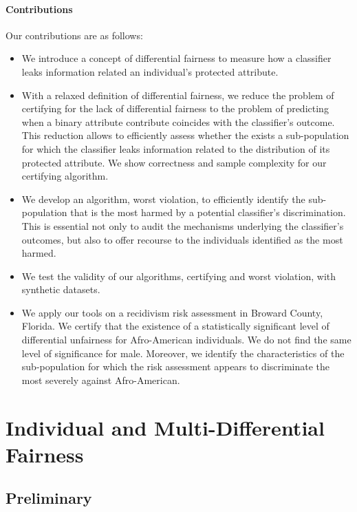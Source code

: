 \documentclass{article}
\begin{document}
 \paragraph{Contributions}
Our contributions are as follows:
\begin{itemize}
	\item We introduce a concept of differential fairness to measure how a classifier leaks information related an individual's protected attribute. 
	\item With a relaxed definition of differential fairness, we reduce the problem of certifying for the lack of differential fairness to the problem of predicting when a binary attribute contribute coincides with the classifier's outcome. This reduction allows to efficiently assess whether the exists a sub-population for which the classifier leaks information related to the distribution of its protected attribute. We show correctness and sample complexity for our certifying algorithm.
	\item We develop an algorithm, worst violation,  to efficiently identify the  sub-population that is the most harmed by a potential classifier's discrimination. This is essential not only to audit the mechanisms underlying the classifier's outcomes, but also to offer recourse to the individuals identified as the most harmed. 
	\item We test the validity of our algorithms, certifying and worst violation, with synthetic datasets.
	\item We apply our tools on a recidivism risk assessment in Broward County, Florida. We certify that the existence of a statistically significant level of differential unfairness for Afro-American individuals. We do not find the same level of significance for male. Moreover, we identify the characteristics of the sub-population for which the risk assessment appears to discriminate the most severely against Afro-American. 
\end{itemize}
 
 
  



\section{Individual and Multi-Differential Fairness}

\subsection{Preliminary}
\end{document}
